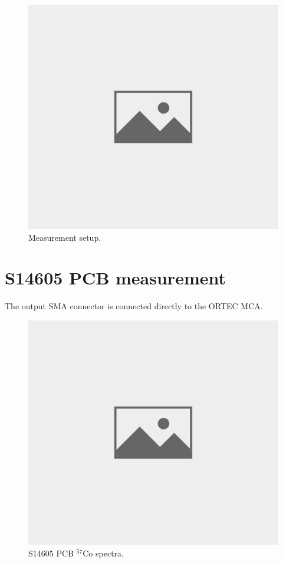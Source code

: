 \begin{figure}[H]
 \centering
 \includegraphics[scale=0.8, angle = 90]{./pictures/NoPicture.jpg}
 \caption{Measurement setup.}
 \label{meas setup}
 
\end{figure}

\section{S14605 PCB measurement}

The output SMA connector is connected directly to the ORTEC MCA.


\begin{figure}[H]
 \centering
 \includegraphics[scale=0.8, angle = 90]{./pictures/NoPicture.jpg}
 \caption{S14605 PCB $^{57}$Co spectra.}
 \label{S14605 PCB spectra.}
\end{figure}


